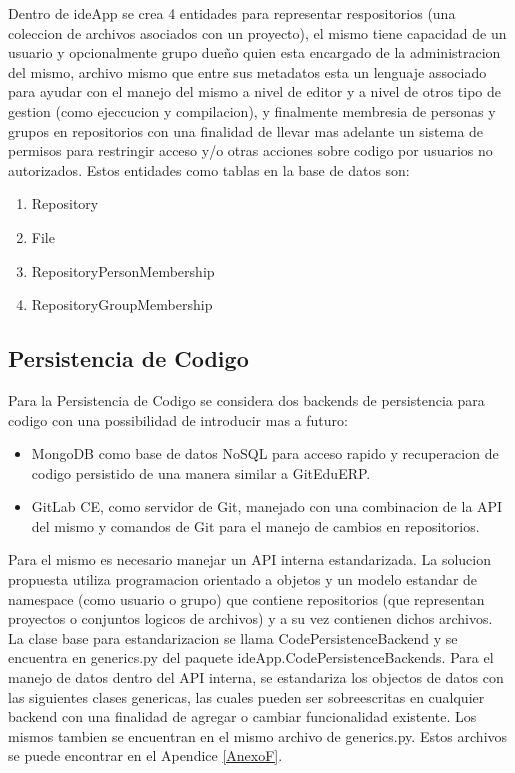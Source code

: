 Dentro de ideApp se crea 4 entidades para representar respositorios (una coleccion de archivos asociados con un proyecto), el mismo tiene capacidad de un usuario y opcionalmente grupo dueño quien esta encargado de la administracion del mismo, archivo mismo que entre sus metadatos esta un lenguaje associado para ayudar con el manejo del mismo a nivel de editor y a nivel de otros tipo de gestion (como ejeccucion y compilacion), y finalmente membresia de personas y grupos en repositorios con una finalidad de llevar mas adelante un sistema de permisos para restringir acceso y/o otras acciones sobre codigo por usuarios no autorizados. Estos entidades como tablas en la base de datos son:
\begin{enumerate}
\item Repository
\item File
\item RepositoryPersonMembership
\item RepositoryGroupMembership
\end{enumerate}


\subsection{Persistencia de Codigo}
Para la Persistencia de Codigo se considera dos backends de persistencia para codigo con una possibilidad de introducir mas a futuro:
\begin{itemize}
	\item MongoDB como base de datos NoSQL para acceso rapido y recuperacion de codigo persistido de una manera similar a GitEduERP.
    \item GitLab CE, como servidor de Git, manejado con una combinacion de la API del mismo y comandos de Git para el manejo de cambios en repositorios.
\end{itemize}

Para el mismo es necesario manejar un API interna estandarizada. La solucion propuesta utiliza programacion orientado a objetos y un modelo estandar de namespace (como usuario o grupo) que contiene repositorios (que representan proyectos o conjuntos logicos de archivos) y a su vez contienen dichos archivos. La clase base para estandarizacion se llama CodePersistenceBackend y se encuentra en generics.py del paquete ideApp.CodePersistenceBackends. Para el manejo de datos dentro del API interna, se estandariza los objectos de datos con las siguientes clases genericas, las cuales pueden ser sobreescritas en cualquier backend con una finalidad de agregar o cambiar funcionalidad existente. Los mismos tambien se encuentran en el mismo archivo de generics.py. Estos archivos se puede encontrar en el Apendice \ref{AnexoF}.

